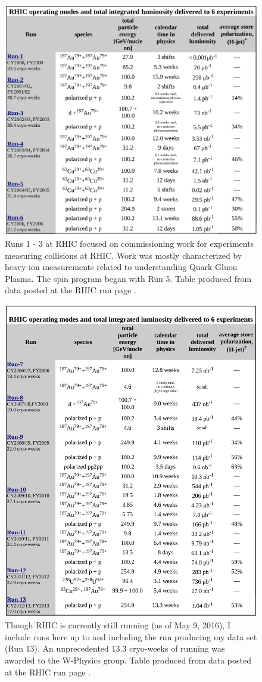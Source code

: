 \begin{figure}[ht]
  \centering
  \includegraphics[width=0.8\linewidth]{./figures/rhic_early_run_summary.png}
  \caption{ 
    Runs 1 - 3 at RHIC focused on commissioning work for experiments measuring
    collisions at RHIC. Work was mostly characterized by heavy-ion measurements
    related to understanding Quark-Gluon Plasma. The spin program began with Run
    5. Table produced from data posted at the RHIC run page \cite{Fischer2016}.
  }
  \label{fig:rhic_early_run_summary}
\end{figure}

\begin{figure}[ht]
  \centering
  \includegraphics[width=0.8\linewidth]{./figures/rhic_late_run_summary.png}
  \caption{ 
    Though RHIC is currently still running (as of May 9, 2016), I include runs
    here up to and including the run producing my data set (Run 13). An
    unprecedented 13.3 cryo-weeks of running was awarded to the W-Physics
    group.  Table produced from data posted at the RHIC run
    page \cite{Fischer2016}.
  }
  \label{fig:rhic_late_run_summary}
\end{figure}

